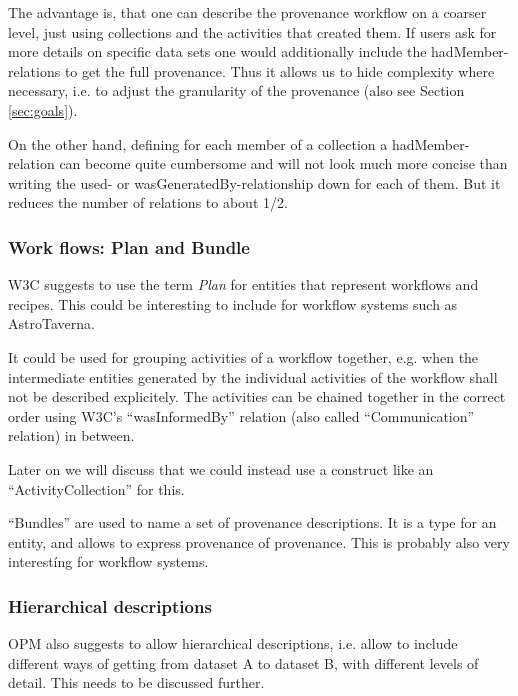The advantage is, that one can describe the provenance workflow on a coarser level, just using collections and the activities that created them. If users ask for more details on specific data sets one would additionally include the hadMember-relations to get the full provenance. Thus it allows us to hide complexity where necessary, i.e. to adjust the granularity of the provenance (also see Section \ref{sec:goals}).

On the other hand, defining for each member of a collection a hadMember-relation can 
become quite cumbersome and will not look much more concise than writing the used- or wasGeneratedBy-relationship down for each of them. But it reduces the number of relations to about 1/2.




\subsubsection{Work flows: Plan and Bundle}
W3C suggests to use the term \emph{Plan} for entities that represent workflows and recipes. This could be interesting to include for workflow systems such as AstroTaverna. 

It could be used for grouping activities of a workflow together, e.g. when
the intermediate entities generated by the individual activities of the workflow shall not be described explicitely. The activities can be chained together in the correct order using W3C's ``wasInformedBy'' relation (also called ``Communication'' relation) in between.

Later on we will discuss that we could instead use a construct like an ``ActivityCollection'' for this.

``Bundles'' are used to name a set of provenance descriptions. It is a type for an entity, and allows to express provenance of provenance. This is probably also very interestíng for workflow systems.


\subsubsection{Hierarchical descriptions}
OPM also suggests to allow hierarchical descriptions, i.e. allow to include different ways of getting from dataset A to dataset B, with different levels of detail. 
This needs to be discussed further. 


